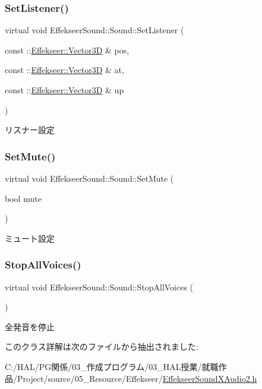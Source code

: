 \subsubsection{\texorpdfstring{Set\+Listener()}{SetListener()}}
{\footnotesize\ttfamily virtual void Effekseer\+Sound\+::\+Sound\+::\+Set\+Listener (\begin{DoxyParamCaption}\item[{const \+::\mbox{\hyperlink{struct_effekseer_1_1_vector3_d}{Effekseer\+::\+Vector3D}} \&}]{pos,  }\item[{const \+::\mbox{\hyperlink{struct_effekseer_1_1_vector3_d}{Effekseer\+::\+Vector3D}} \&}]{at,  }\item[{const \+::\mbox{\hyperlink{struct_effekseer_1_1_vector3_d}{Effekseer\+::\+Vector3D}} \&}]{up }\end{DoxyParamCaption})\hspace{0.3cm}{\ttfamily [pure virtual]}}



リスナー設定 

\mbox{\label{class_effekseer_sound_1_1_sound_a60df80be173cb76ef495bde597a7c407}} 
\subsubsection{\texorpdfstring{Set\+Mute()}{SetMute()}}
{\footnotesize\ttfamily virtual void Effekseer\+Sound\+::\+Sound\+::\+Set\+Mute (\begin{DoxyParamCaption}\item[{bool}]{mute }\end{DoxyParamCaption})\hspace{0.3cm}{\ttfamily [pure virtual]}}



ミュート設定 

\mbox{\label{class_effekseer_sound_1_1_sound_ace2026566bc2bdaf49962293c5b06aa2}} 
\subsubsection{\texorpdfstring{Stop\+All\+Voices()}{StopAllVoices()}}
{\footnotesize\ttfamily virtual void Effekseer\+Sound\+::\+Sound\+::\+Stop\+All\+Voices (\begin{DoxyParamCaption}{ }\end{DoxyParamCaption})\hspace{0.3cm}{\ttfamily [pure virtual]}}



全発音を停止 



このクラス詳解は次のファイルから抽出されました\+:\begin{DoxyCompactItemize}
\item 
C\+:/\+H\+A\+L/\+P\+G関係/03\+\_\+作成プログラム/03\+\_\+\+H\+A\+L授業/就職作品/\+Project/source/05\+\_\+\+Resource/\+Effekseer/\mbox{\hyperlink{_effekseer_sound_x_audio2_8h}{Effekseer\+Sound\+X\+Audio2.\+h}}\end{DoxyCompactItemize}
